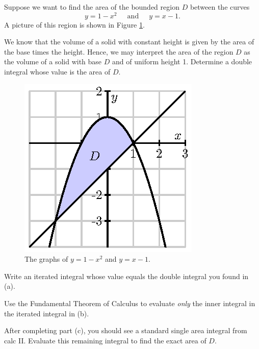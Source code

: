 \begin{activity} \label{A:11.4.1} Suppose we want to find the area of the bounded region $D$ between the curves
\[y = 1-x^2 \ \ \ \ \ \text{ and } \ \ \ \ \ y=x-1.\]
A picture of this region is shown in Figure \ref{F:11.4.Area_ex_1}. 

\ba
	\item We know that the volume of a solid with constant height is given by the area of the base times the height.  Hence, we may interpret the area of the region $D$ as the volume of a solid with base $D$ and of uniform height 1.  Determine a double integral whose value is the area of $D$. 
\begin{figure}[ht]
\begin{center}
  \includegraphics{figures/fig_11_4_area.eps}
\end{center}
\caption{The graphs of $y = 1-x^2$ and $y=x-1$.}
\label{F:11.4.Area_ex_1}
\end{figure}

	\item Write an iterated integral whose value equals the double integral you found in (a).
	\item Use the Fundamental Theorem of Calculus to evaluate \emph{only} the inner integral in the iterated integral in (b).  
	\item After completing part (c), you should see a standard single area integral from calc II. Evaluate this remaining integral to find the exact area of $D$.
\ea

\end{activity}
\begin{smallhint}

\end{smallhint}
